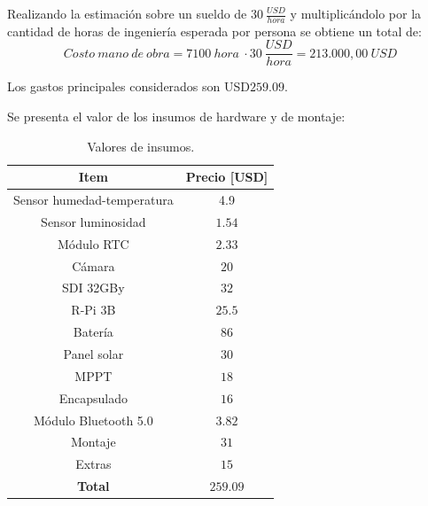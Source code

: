 Realizando la estimación sobre un sueldo de $30 \ \frac{USD}{hora}$ y multiplicándolo por la cantidad de horas de ingeniería esperada por persona se obtiene un total de: $$Costo \ mano \ de \ obra = 7100 \ hora \ \cdot 30 \ \frac{USD}{hora} = 213.000,00 \ USD$$



Los gastos principales considerados son USD$259.09$. %

Se presenta el valor de los insumos de hardware y de montaje:
\begin{table}[H]
\centering
\begin{tabular}{|c|c|}
\hline
\textbf{Item}                                                         & \textbf{Precio [USD]}				  \\ \hline
Sensor humedad-temperatura 											  & 4.9                                   \\ \hline
Sensor luminosidad                                                    & $1.54    $                              \\ \hline
M\'odulo RTC                                                     & $2.33$                                  \\ \hline
Cámara                                                                & $20$                                    \\ \hline
SDI 32GBy                                                             & $32$                                    \\ \hline
R-Pi 3B
 & $25.5$                                  \\ \hline
Batería                                                               & $86  $                 				  \\ \hline
Panel solar                                                           & $30$ 				  \\ \hline
MPPT                                                                  & $18$                                    \\ \hline
Encapsulado                                                           & $16$                                    \\ \hline
Módulo Bluetooth 5.0                                                           & $3.82 $                                   \\ \hline
Montaje                                                               & $31$                                    \\ \hline
Extras
& $15$									\\ \hline
\textbf{Total}
&\textbf{$259.09$}
\end{tabular}
\caption{Valores de insumos.}
\end{table}


